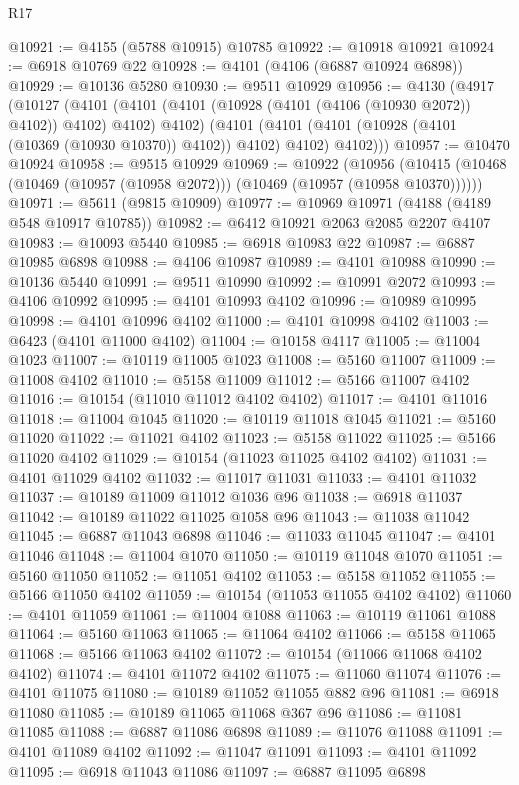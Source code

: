 \begin{lexlean}{R17}
\begin{coremodule}
@10921 := @4155 (@5788 @10915) @10785
@10922 := @10918 @10921
@10924 := @6918 @10769 @22
@10928 := @4101 (@4106 (@6887 @10924 @6898))
@10929 := @10136 @5280
@10930 := @9511 @10929
@10956 := @4130
    (@4917
      (@10127
        (@4101 (@4101 (@4101 (@10928 (@4101 (@4106 (@10930 @2072)) @4102)) @4102) @4102) @4102)
        (@4101 (@4101 (@4101 (@10928 (@4101 (@10369 (@10930 @10370)) @4102)) @4102) @4102) @4102)))
@10957 := @10470 @10924
@10958 := @9515 @10929
@10969 := @10922
    (@10956 (@10415 (@10468 (@10469 (@10957 (@10958 @2072))) (@10469 (@10957 (@10958 @10370))))))
@10971 := @5611 (@9815 @10909)
@10977 := @10969 @10971 (@4188 (@4189 @548 @10917 @10785))
@10982 := @6412 @10921 @2063 @2085 @2207 @4107
@10983 := @10093 @5440
@10985 := @6918 @10983 @22
@10987 := @6887 @10985 @6898
@10988 := @4106 @10987
@10989 := @4101 @10988
@10990 := @10136 @5440
@10991 := @9511 @10990
@10992 := @10991 @2072
@10993 := @4106 @10992
@10995 := @4101 @10993 @4102
@10996 := @10989 @10995
@10998 := @4101 @10996 @4102
@11000 := @4101 @10998 @4102
@11003 := @6423 (@4101 @11000 @4102)
@11004 := @10158 @4117
@11005 := @11004 @1023
@11007 := @10119 @11005 @1023
@11008 := @5160 @11007
@11009 := @11008 @4102
@11010 := @5158 @11009
@11012 := @5166 @11007 @4102
@11016 := @10154 (@11010 @11012 @4102 @4102)
@11017 := @4101 @11016
@11018 := @11004 @1045
@11020 := @10119 @11018 @1045
@11021 := @5160 @11020
@11022 := @11021 @4102
@11023 := @5158 @11022
@11025 := @5166 @11020 @4102
@11029 := @10154 (@11023 @11025 @4102 @4102)
@11031 := @4101 @11029 @4102
@11032 := @11017 @11031
@11033 := @4101 @11032
@11037 := @10189 @11009 @11012 @1036 @96
@11038 := @6918 @11037
@11042 := @10189 @11022 @11025 @1058 @96
@11043 := @11038 @11042
@11045 := @6887 @11043 @6898
@11046 := @11033 @11045
@11047 := @4101 @11046
@11048 := @11004 @1070
@11050 := @10119 @11048 @1070
@11051 := @5160 @11050
@11052 := @11051 @4102
@11053 := @5158 @11052
@11055 := @5166 @11050 @4102
@11059 := @10154 (@11053 @11055 @4102 @4102)
@11060 := @4101 @11059
@11061 := @11004 @1088
@11063 := @10119 @11061 @1088
@11064 := @5160 @11063
@11065 := @11064 @4102
@11066 := @5158 @11065
@11068 := @5166 @11063 @4102
@11072 := @10154 (@11066 @11068 @4102 @4102)
@11074 := @4101 @11072 @4102
@11075 := @11060 @11074
@11076 := @4101 @11075
@11080 := @10189 @11052 @11055 @882 @96
@11081 := @6918 @11080
@11085 := @10189 @11065 @11068 @367 @96
@11086 := @11081 @11085
@11088 := @6887 @11086 @6898
@11089 := @11076 @11088
@11091 := @4101 @11089 @4102
@11092 := @11047 @11091
@11093 := @4101 @11092
@11095 := @6918 @11043 @11086
@11097 := @6887 @11095 @6898

\end{coremodule}
\end{lexlean}
